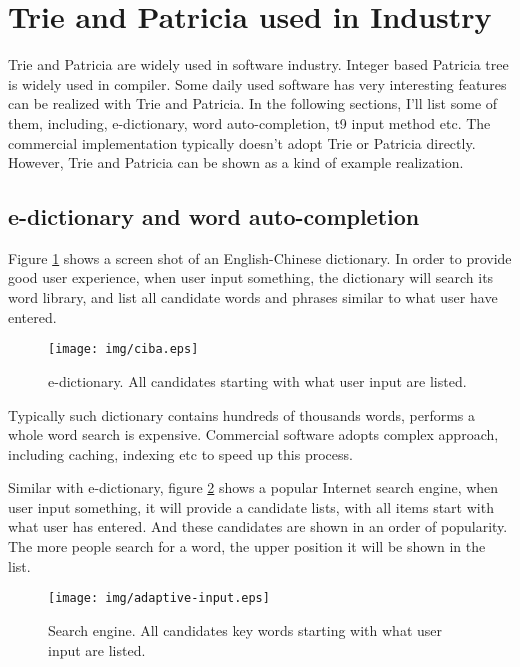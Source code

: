 \documentclass{article}
\begin{document}
\section{Trie and Patricia used in Industry}
Trie and Patricia are widely used in software industry. Integer based
Patricia tree is widely used in compiler. Some daily
used software has very interesting features can be realized with 
Trie and Patricia. In the following sections, I'll list some of them,
including, e-dictionary, word auto-completion, t9 input method etc.
The commercial implementation typically doesn't adopt Trie or Patricia
directly. However, Trie and Patricia can be shown as a kind of 
example realization.

\subsection{e-dictionary and word auto-completion}
Figure \ref{fig:e-dict} shows a screen shot of an English-Chinese dictionary.
In order to provide good user experience, when user input something, 
the dictionary will search its word library, and list all candidate words and
phrases similar to what user have entered.

\begin{figure}[htbp]
       \begin{center}
	\texttt{[image: img/ciba.eps]}
        \caption{e-dictionary. All candidates starting with what user input are listed.}
        \label{fig:e-dict}
       \end{center}
\end{figure}

Typically such dictionary contains hundreds of thousands words, performs a whole
word search is expensive. Commercial software adopts complex approach, including
caching, indexing etc to speed up this process.

Similar with e-dictionary, figure \ref{fig:word-completion} shows a popular
Internet search engine, when user input something, it will provide a candidate
lists, with all items start with what user has entered. And these candidates
are shown in an order of popularity. The more people search for a word, the
upper position it will be shown in the list.

\begin{figure}[htbp]
       \begin{center}
	\texttt{[image: img/adaptive-input.eps]}
        \caption{Search engine. All candidates key words starting with what user input are listed.}
        \label{fig:word-completion}
       \end{center}
\end{figure}
\end{document}
